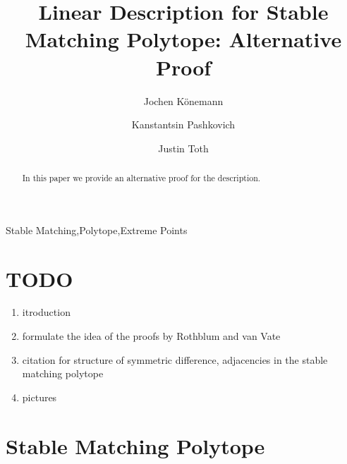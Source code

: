 \documentclass[preprint]{elsarticle}
\begin{document}
\begin{frontmatter}



\title{Linear Description for Stable Matching Polytope: Alternative Proof}
\author[co]{Jochen K\"{o}nemann}
\author[co]{Kanstantsin Pashkovich}
\author[co]{Justin Toth}
\address[co]{Department of Combinatorics and Optimization, University of Waterloo, Canada}


\begin{abstract}
In this paper we provide an alternative proof for the description.
\end{abstract}
\begin{keyword}
Stable Matching\sep Polytope\sep Extreme Points
\end{keyword}
\end{frontmatter}
{\color{red}
\section*{TODO}
\begin{enumerate}
	\item itroduction
	\item formulate the idea of the proofs by Rothblum and van Vate
	\item citation for structure of symmetric difference, adjacencies in the stable matching polytope
	\item pictures
\end{enumerate}
}
\section{Stable Matching Polytope}
\end{document}
